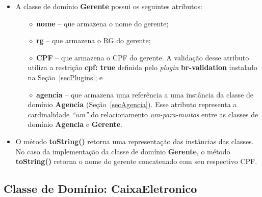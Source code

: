 \begin{itemize}

\item A classe de domínio {\bf Gerente} possui os seguintes atributos:

\vspace{0.5cm}

\begin{itemize}

\item[$\diamond$] {\bf nome} -- que armazena o nome do gerente; 

\vspace{0.5cm}

\item[$\diamond$] {\bf rg} -- que armazena o RG do gerente; 

\vspace{0.5cm}

\item[$\diamond$] {\bf CPF} -- que  armazena o CPF do gerente.  A
  validação desse  atributo utiliza a  restrição {\bf cpf: true}  definida pelo
  {\it plugin} {\bf br-validation} instalado na Seção~\ref{secPlugins}; e

\vspace{0.5cm}


\item[$\diamond$] {\bf agencia}  -- que armazena uma referência  a uma instância
  da classe  de domínio  {\bf Agencia} (Seção~\ref{secAgencia}).   Esse atributo
  representa a cardinalidade {\em ``um''} do relacionamento {\em um-para-muitos}
  entre as classes de domínio {\bf Agencia} e {\bf Gerente}.

\end{itemize}

\vspace{0.5cm}

\item O  método {\bf  toString()} retorna uma  representação das  instâncias das
  classes.   No caso  da implementação  da classe  de domínio  {\bf  Gerente}, o
  método  {\bf  toString()}  retorna  o  nome do  gerente  concatenado  com  seu
  respectivo CPF.

\end{itemize}

\newpage

\subsection{Classe de Domínio: CaixaEletronico}\label{secCaixaEletronico}

